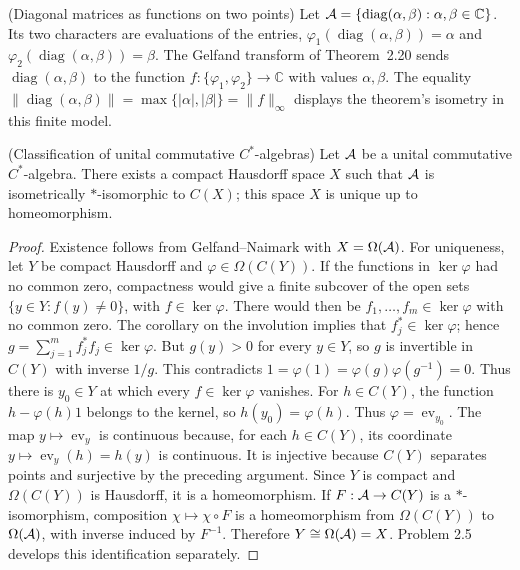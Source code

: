 \begin{cthejemplo}{(Diagonal matrices as functions on two points)}
Let $\mathcal A=\{\operatorname{diag}(\alpha,\beta):\alpha,\beta\in\mathbb C\}$.
Its two characters are evaluations of the entries,
$\varphi_1(\operatorname{diag}(\alpha,\beta))=\alpha$ and
$\varphi_2(\operatorname{diag}(\alpha,\beta))=\beta$.
The Gelfand transform of Theorem~2.20 sends
$\operatorname{diag}(\alpha,\beta)$ to the function
$f:\{\varphi_1,\varphi_2\}\to\mathbb C$ with values $\alpha,\beta$.
The equality $\|\operatorname{diag}(\alpha,\beta)\|=\max\{|\alpha|,|\beta|\}
=\|f\|_\infty$ displays the theorem's isometry in this finite model.
\end{cthejemplo}

\begin{cthcorolario}{(Classification of unital commutative $C^*$-algebras)}
Let $\mathcal A$ be a unital commutative $C^*$-algebra. There exists a compact
Hausdorff space $X$ such that $\mathcal A$ is isometrically $*$-isomorphic to $C(X)$;
this space $X$ is unique up to homeomorphism.
\end{cthcorolario}

\begin{proof}[Proof]
Existence follows from Gelfand--Naimark with $X=\Omega(\mathcal A)$.
For uniqueness, let $Y$ be compact Hausdorff and
$\varphi\in\Omega(C(Y))$. If the functions in $\ker\varphi$ had no common
zero, compactness would give a finite subcover of the open sets
$\{y\in Y:f(y)\neq0\}$, with $f\in\ker\varphi$. There would then be
$f_1,\ldots,f_m\in\ker\varphi$ with no common zero. The corollary on the
involution implies that $f_j^*\in\ker\varphi$; hence
$g=\sum_{j=1}^m f_j^*f_j\in\ker\varphi$. But $g(y)>0$ for every $y\in Y$,
so $g$ is invertible in $C(Y)$ with inverse $1/g$. This contradicts
$1=\varphi(1)=\varphi(g)\varphi(g^{-1})=0$.
Thus there is $y_0\in Y$ at which every $f\in\ker\varphi$ vanishes.
For $h\in C(Y)$, the function $h-\varphi(h)1$ belongs to the kernel, so
$h(y_0)=\varphi(h)$. Thus $\varphi=\operatorname{ev}_{y_0}$.
The map $y\mapsto\operatorname{ev}_y$ is continuous because, for each
$h\in C(Y)$, its coordinate $y\mapsto\operatorname{ev}_y(h)=h(y)$ is continuous.
It is injective because $C(Y)$ separates points and surjective by the
preceding argument. Since $Y$ is compact and $\Omega(C(Y))$ is Hausdorff,
it is a homeomorphism.
If $F:\mathcal A\to C(Y)$ is a $*$-isomorphism, composition
$\chi\mapsto\chi\circ F$ is a homeomorphism from $\Omega(C(Y))$ to
$\Omega(\mathcal A)$, with inverse induced by $F^{-1}$. Therefore
$Y\cong\Omega(\mathcal A)=X$. Problem 2.5 develops this identification separately.
\end{proof}

